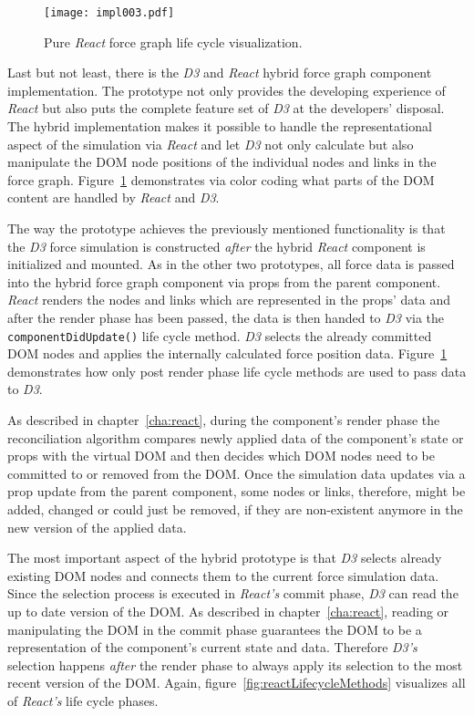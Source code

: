\begin{figure}
\centering
\texttt{[image: impl003.pdf]}
\caption{Pure \emph{React} force graph life cycle visualization.}
\label{fig:reactD3HybridLifeCycle}
\end{figure}

Last but not least, there is the \emph{D3} and \emph{React} hybrid force graph component implementation. The prototype not only provides the developing experience of \emph{React} but also puts the complete feature set of \emph{D3} at the developers' disposal. The hybrid implementation makes it possible to handle the representational aspect of the simulation via \emph{React} and let \emph{D3} not only calculate but also manipulate the DOM node positions of the individual nodes and links in the force graph. Figure~\ref{fig:reactD3HybridLifeCycle} demonstrates via color coding what parts of the DOM content are handled by \emph{React} and \emph{D3}. 

The way the prototype achieves the previously mentioned functionality is that the \emph{D3} force simulation is constructed \emph{after} the hybrid \emph{React} component is initialized and mounted. As in the other two prototypes, all force data is passed into the hybrid force graph component via props from the parent component. \emph{React} renders the nodes and links which are represented in the props' data and after the render phase has been passed, the data is then handed to \emph{D3} via the \texttt{componentDidUpdate()} life cycle method. \emph{D3} selects the already committed DOM nodes and applies the internally calculated force position data. Figure~\ref{fig:reactD3HybridLifeCycle} demonstrates how only post render phase life cycle methods are used to pass data to \emph{D3}.

As described in chapter~\ref{cha:react}, during the component's render phase the reconciliation algorithm compares newly applied data of the component's state or props with the virtual DOM and then decides which DOM nodes need to be committed to or removed from the DOM. Once the simulation data updates via a prop update from the parent component, some nodes or links, therefore, might be added, changed or could just be removed, if they are non-existent anymore in the new version of the applied data.

The most important aspect of the hybrid prototype is that \emph{D3} selects already existing DOM nodes and connects them to the current force simulation data. Since the selection process is executed in \emph{React's} commit phase, \emph{D3} can read the up to date version of the DOM. As described in chapter~\ref{cha:react}, reading or manipulating the DOM in the commit phase guarantees the DOM to be a representation of the component's current state and data. Therefore \emph{D3's} selection happens \emph{after} the render phase to always apply its selection to the most recent version of the DOM. Again, figure~\ref{fig:reactLifecycleMethods} visualizes all of \emph{React's} life cycle phases.

